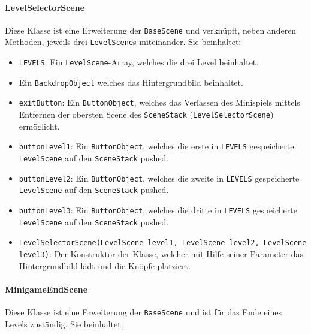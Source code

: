 \paragraph{LevelSelectorScene} Diese Klasse ist eine Erweiterung der \texttt{BaseScene} und verknüpft, neben anderen Methoden, jeweils drei \texttt{LevelScene}s miteinander.
Sie beinhaltet:

\begin{sloppypar}
    \begin{itemize}
        \item \texttt{LEVELS}: Ein \texttt{LevelScene}-Array, welches die drei Level beinhaltet.
        \item Ein \texttt{BackdropObject} welches das Hintergrundbild beinhaltet.
        \item \texttt{exitButton}: Ein \texttt{ButtonObject}, welches das Verlassen des Minispiels mittels Entfernen der obersten Scene des \texttt{SceneStack} (\texttt{LevelSelectorScene}) ermöglicht.
        \item \texttt{buttonLevel1}: Ein \texttt{ButtonObject}, welches die erste in \texttt{LEVELS} gespeicherte \texttt{LevelScene} auf den \texttt{SceneStack} pushed.
        \item \texttt{buttonLevel2}: Ein \texttt{ButtonObject}, welches die zweite in \texttt{LEVELS} gespeicherte \texttt{LevelScene} auf den \texttt{SceneStack} pushed.
        \item \texttt{buttonLevel3}: Ein \texttt{ButtonObject}, welches die dritte in \texttt{LEVELS} gespeicherte \texttt{LevelScene} auf den \texttt{SceneStack} pushed.
        \item \texttt{LevelSelectorScene(LevelScene level1, LevelScene level2, LevelScene level3)}: Der Konstruktor der Klasse, welcher mit Hilfe seiner Parameter das Hintergrundbild lädt und die Knöpfe platziert.
    \end{itemize}
\end{sloppypar}

\paragraph{MinigameEndScene} Diese Klasse ist eine Erweiterung der \texttt{BaseScene} und ist für das Ende eines Levels zuständig.
Sie beinhaltet:

